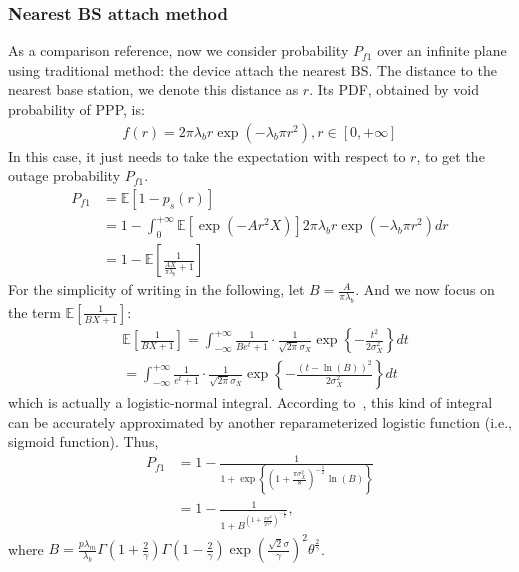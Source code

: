 \subsubsection{Nearest BS attach method}
As a comparison reference, now we consider probability $P_{f1}$ over an infinite plane using traditional method: the device attach the nearest BS.
The distance to the nearest base station, we denote this distance as $r$. Its PDF, obtained by void probability of PPP, is:
\begin{align}
\label{eq:pdf_nearest_distance}
f\left( r\right)  = 2 \pi \lambda_b  r \exp(-\lambda_b \pi r^2), r \in \left[ 0, +\infty\right] 
\end{align}
In this case, it just needs to take the expectation with respect to $r$, to get the outage probability $P_{f1}$.
\begin{align}
P_{f1}&= \mathbb{E}\left[ 1-p_{s}\left(r\right) \right]  \nonumber\\
&= 1-\int_{0}^{+\infty} \mathbb{E}\left[ \exp(-A r^2 X)\right]  2 \pi \lambda_b  r \exp(-\lambda_b \pi r^2) dr \nonumber\\
&= 1 - \mathbb{E}\left[ \frac{1}{\frac{AX}{\pi\lambda_b}+1} \right] \nonumber
\end{align}
For the simplicity  of writing in the following, let $B= \frac{A}{\pi \lambda_b}$. And we now focus on the term $\mathbb{E}\left[ \frac{1}{BX+1} \right]$: 
\begin{align}
\label{eq:mean_bx+1_step1}
&\mathbb{E}\left[ \frac{1}{BX+1} \right]  = \int_{-\infty}^{+\infty} \frac{1}{ Be^t+1} \cdot \frac{1}{\sqrt{2\pi} \sigma_X} \exp\left\lbrace -\frac{t^2}{2 \sigma_X^2}\right\rbrace dt \nonumber\\
&= \int_{-\infty}^{+\infty} \frac{1}{ e^t+1} \cdot \frac{1}{\sqrt{2\pi} \sigma_X} \exp\left\lbrace -\frac{(t-\ln(B))^2}{2 \sigma_X^2}\right\rbrace dt
\end{align}
which is actually a logistic-normal integral. According to~\cite{crooks2009logistic}, this kind of integral can be accurately approximated by another reparameterized logistic function (i.e., sigmoid function). Thus,
\begin{align}
	\label{eq:analytical_result_approach_2}
	P_{f1} &= 1 -\frac{1}{1 + \exp\left\lbrace \left( 1 +\frac{\pi \sigma_X^2}{8} \right)^{-\frac{1}{2}} \ln(B) \right\rbrace} \nonumber\\
	&=1-\frac{1}{1 + B^{\left( 1 +\frac{\pi \sigma^2}{2\gamma^2} \right)^{-\frac{1}{2}}}},
\end{align}
where $B= \frac{p\lambda_m}{\lambda_b}\Gamma(1+\frac{2}{\gamma}) \Gamma(1-\frac{2}{\gamma}) \exp \left( \frac{\sqrt{2}\sigma}{\gamma}\right) ^2 \theta^{\frac{2}{\gamma}}$.
